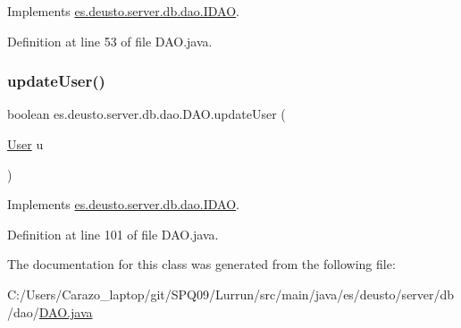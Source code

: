 Implements \hyperlink{interfacees_1_1deusto_1_1server_1_1db_1_1dao_1_1_i_d_a_o_a601329b95123948b10c3232687b11d5b}{es.\+deusto.\+server.\+db.\+dao.\+I\+D\+AO}.



Definition at line 53 of file D\+A\+O.\+java.

\mbox{\label{classes_1_1deusto_1_1server_1_1db_1_1dao_1_1_d_a_o_a7f6ed77294fe1f61cbebbea410cef6e0}} 
\subsubsection{\texorpdfstring{update\+User()}{updateUser()}}
{\footnotesize\ttfamily boolean es.\+deusto.\+server.\+db.\+dao.\+D\+A\+O.\+update\+User (\begin{DoxyParamCaption}\item[{\hyperlink{classes_1_1deusto_1_1server_1_1db_1_1data_1_1_user}{User}}]{u }\end{DoxyParamCaption})}



Implements \hyperlink{interfacees_1_1deusto_1_1server_1_1db_1_1dao_1_1_i_d_a_o_a790b00e2989b634c1bbb2c6620ff3583}{es.\+deusto.\+server.\+db.\+dao.\+I\+D\+AO}.



Definition at line 101 of file D\+A\+O.\+java.



The documentation for this class was generated from the following file\+:\begin{DoxyCompactItemize}
\item 
C\+:/\+Users/\+Carazo\+\_\+laptop/git/\+S\+P\+Q09/\+Lurrun/src/main/java/es/deusto/server/db/dao/\hyperlink{_d_a_o_8java}{D\+A\+O.\+java}\end{DoxyCompactItemize}
